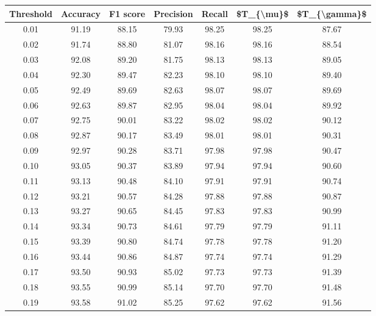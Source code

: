\begin{tabular}{|c|c|c|c|c|c|c|}
\hline
 Threshold &  Accuracy &  F1 score &  Precision &  Recall &  \$T\_\{\textbackslash mu\}\$ &  \$T\_\{\textbackslash gamma\}\$ \\
\hline
      0.01 &     91.19 &     88.15 &      79.93 &   98.25 &      98.25 &         87.67 \\
      0.02 &     91.74 &     88.80 &      81.07 &   98.16 &      98.16 &         88.54 \\
      0.03 &     92.08 &     89.20 &      81.75 &   98.13 &      98.13 &         89.05 \\
      0.04 &     92.30 &     89.47 &      82.23 &   98.10 &      98.10 &         89.40 \\
      0.05 &     92.49 &     89.69 &      82.63 &   98.07 &      98.07 &         89.69 \\
      0.06 &     92.63 &     89.87 &      82.95 &   98.04 &      98.04 &         89.92 \\
      0.07 &     92.75 &     90.01 &      83.22 &   98.02 &      98.02 &         90.12 \\
      0.08 &     92.87 &     90.17 &      83.49 &   98.01 &      98.01 &         90.31 \\
      0.09 &     92.97 &     90.28 &      83.71 &   97.98 &      97.98 &         90.47 \\
      0.10 &     93.05 &     90.37 &      83.89 &   97.94 &      97.94 &         90.60 \\
      0.11 &     93.13 &     90.48 &      84.10 &   97.91 &      97.91 &         90.74 \\
      0.12 &     93.21 &     90.57 &      84.28 &   97.88 &      97.88 &         90.87 \\
      0.13 &     93.27 &     90.65 &      84.45 &   97.83 &      97.83 &         90.99 \\
      0.14 &     93.34 &     90.73 &      84.61 &   97.79 &      97.79 &         91.11 \\
      0.15 &     93.39 &     90.80 &      84.74 &   97.78 &      97.78 &         91.20 \\
      0.16 &     93.44 &     90.86 &      84.87 &   97.74 &      97.74 &         91.29 \\
      0.17 &     93.50 &     90.93 &      85.02 &   97.73 &      97.73 &         91.39 \\
      0.18 &     93.55 &     90.99 &      85.14 &   97.70 &      97.70 &         91.48 \\
      0.19 &     93.58 &     91.02 &      85.25 &   97.62 &      97.62 &         91.56 \\

\end{tabular}
